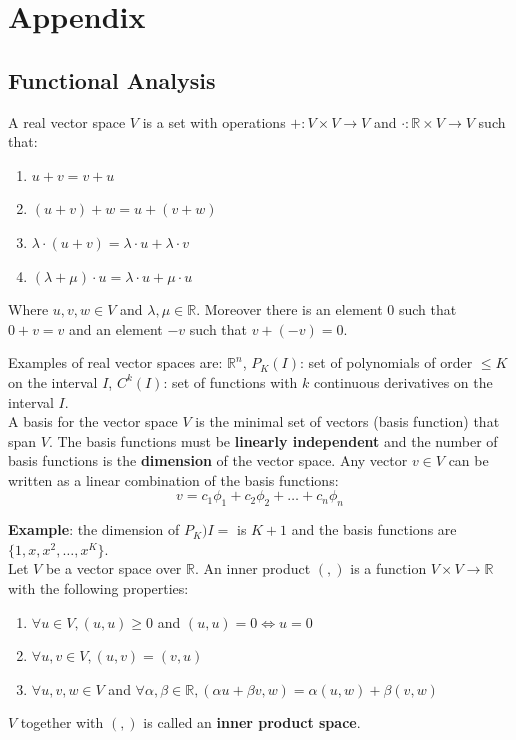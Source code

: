 \section{Appendix}
\subsection{Functional Analysis}
A real vector space $V$ is a set with operations $+ : V \times V \to V$ and $\cdot: \mathbb{R}\times V \to V$ such that:
\begin{enumerate}
    \item $u+v = v+u$
    \item $(u+v)+w = u+(v+w)$
    \item $\lambda\cdot(u+v) = \lambda\cdot u + \lambda\cdot v$
    \item $(\lambda + \mu)\cdot u = \lambda \cdot u + \mu \cdot u$
\end{enumerate}
Where $u,v,w \in V$ and $\lambda,\mu \in \mathbb{R}$. Moreover there is an element 0 such that $0+v = v$ and an element $-v$ such that $v+(-v) = 0$.

Examples of real vector spaces are: $\mathbb{R}^n$, $P_K(I)$: set of polynomials of order $\leq K$ on the interval $I$, $C^k(I)$: set of functions with $k$ continuous derivatives on the interval $I$.\\

A basis for the vector space $V$ is the minimal set of vectors (basis function) that span $V$. The basis functions must be \textbf{linearly independent} and the number of basis functions is the \textbf{dimension} of the vector space. Any vector $v \in V$ can be written as a linear combination of the basis functions:
\[
    v = c_1 \phi_1 + c_2 \phi_2 + \dots + c_n \phi_n    
\]

\textbf{Example}: the dimension of $P_K)I=$ is $K+1$ and the basis functions are $\{1,x,x^2,\dots,x^K\}$.\\

Let $V$ be a vector space over $\mathbb{R}$. An inner product $(,)$ is a function $V \times V \to \mathbb{R}$ with the following properties:
\begin{enumerate}
    \item $\forall u \in V, (u,u) \geq 0 $ and $(u,u) = 0 \iff u = 0$
    \item $\forall u,v \in V, (u,v) = (v,u)$
    \item $\forall u,v,w \in V$ and $\forall \alpha,\beta \in \mathbb{R}, (\alpha u + \beta v, w) = \alpha(u,w) + \beta(v,w)$
\end{enumerate}
$V$ together with $(,)$ is called an \textbf{inner product space}.\\

